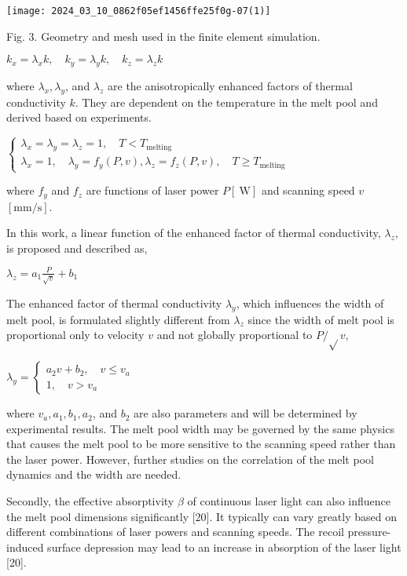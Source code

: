 \documentclass[10pt]{article}
\begin{document}
\begin{center}
\texttt{[image: 2024\_03\_10\_0862f05ef1456ffe25f0g-07(1)]}
\end{center}

Fig. 3. Geometry and mesh used in the finite element simulation.

$k_{x}=\lambda_{x} k, \quad k_{y}=\lambda_{y} k, \quad k_{z}=\lambda_{z} k$

where $\lambda_{x}, \lambda_{y}$, and $\lambda_{z}$ are the anisotropically enhanced factors of thermal conductivity $k$. They are dependent on the temperature in the melt pool and derived based on experiments.

$\left\{\begin{array}{c}\lambda_{x}=\lambda_{y}=\lambda_{z}=1, \quad T<T_{\text {melting }} \\ \lambda_{x}=1, \quad \lambda_{y}=f_{y}(P, v), \lambda_{z}=f_{z}(P, v), \quad T \geqslant T_{\text {melting }}\end{array}\right.$

where $f_{y}$ and $f_{z}$ are functions of laser power $P[\mathrm{~W}]$ and scanning speed $v$ $[\mathrm{mm} / \mathrm{s}]$.

In this work, a linear function of the enhanced factor of thermal conductivity, $\lambda_{z}$, is proposed and described as,

$\lambda_{z}=a_{1} \frac{P}{\sqrt{v}}+b_{1}$

The enhanced factor of thermal conductivity $\lambda_{y}$, which influences the width of melt pool, is formulated slightly different from $\lambda_{z}$ since the width of melt pool is proportional only to velocity $v$ and not globally proportional to $P / \sqrt{ } v$,

$\lambda_{y}=\left\{\begin{array}{c}a_{2} v+b_{2}, \quad v \leqslant v_{a} \\ 1, \quad v>v_{a}\end{array}\right.$

where $v_{a}, a_{1}, b_{1}, a_{2}$, and $b_{2}$ are also parameters and will be determined by experimental results. The melt pool width may be governed by the same physics that causes the melt pool to be more sensitive to the scanning speed rather than the laser power. However, further studies on the correlation of the melt pool dynamics and the width are needed.

Secondly, the effective absorptivity $\beta$ of continuous laser light can also influence the melt pool dimensions significantly [20]. It typically can vary greatly based on different combinations of laser powers and scanning speeds. The recoil pressure-induced surface depression may lead to an increase in absorption of the laser light [20].
\end{document}
